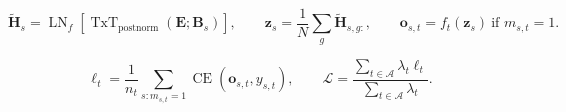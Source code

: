 \documentclass[12pt]{article}
\begin{document}
\newpage

\[
\boxed{
\widetilde{\bm H}_s
=\operatorname{LN}_f\!\left[
\operatorname{TxT}_{\mathrm{postnorm}}(\bm E;\bm B_s)
\right],
\qquad
\bm z_s=\frac1N\sum_g\widetilde{\bm H}_{s,g:},
\qquad
\bm o_{s,t}=f_t(\bm z_s)\ \text{if }m_{s,t}=1.}
\]

\newpage

\[
\boxed{
\ell_t
=\frac1{n_t}\sum_{s:m_{s,t}=1}\operatorname{CE}(\bm o_{s,t},y_{s,t}),
\qquad
\mathcal L
=\frac{\sum_{t\in\mathcal A}\lambda_t\ell_t}
{\sum_{t\in\mathcal A}\lambda_t}.}
\]
\end{document}

